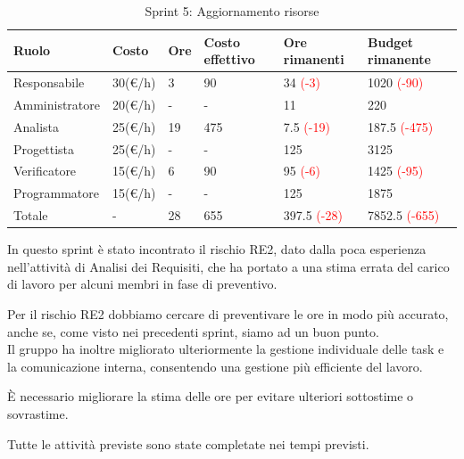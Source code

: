 \begin{table}[H]
	\centering
	\begin{tabular}{|p{}|p{}|p{}|p{}|p{}|p{}|}
		\hline
		\rowcolor{gray!25}
		Ruolo & Costo & Ore & Costo \newline effettivo & Ore \newline rimanenti & Budget \newline rimanente \\ \hline
		Responsabile   & 30(€/h) & 3 & 90 & 34 \textcolor{red}{(-3)} & 1020 \textcolor{red}{(-90)} \\ \hline
		Amministratore & 20(€/h) & - & - & 11 & 220 \\ \hline
		Analista       & 25(€/h) & 19 & 475 & 7.5 \textcolor{red}{(-19)} & 187.5 \textcolor{red}{(-475)} \\ \hline
		Progettista    & 25(€/h) & - & - & 125 & 3125 \\ \hline
		Verificatore   & 15(€/h) & 6 & 90 & 95 \textcolor{red}{(-6)} & 1425 \textcolor{red}{(-95)} \\ \hline
		Programmatore  & 15(€/h) & - & - & 125 & 1875 \\ \hline
		Totale         & - & 28 & 655 & 397.5 \textcolor{red}{(-28)} & 7852.5 \textcolor{red}{(-655)} \\ \hline
	\end{tabular}
	\caption{Sprint 5: Aggiornamento risorse}
\end{table}
In questo sprint è stato incontrato il rischio RE2, dato dalla poca esperienza nell'attività di Analisi dei Requisiti, che ha portato a una stima errata del carico di lavoro per alcuni membri in fase di preventivo.

Per il rischio RE2 dobbiamo cercare di preventivare le ore in modo più accurato, anche se, come visto nei precedenti sprint, siamo ad un buon punto.\\
Il gruppo ha inoltre migliorato ulteriormente la gestione individuale delle task e la comunicazione interna, consentendo una gestione più efficiente del lavoro.

È necessario migliorare la stima delle ore per evitare ulteriori sottostime o sovrastime.

Tutte le attività previste sono state completate nei tempi previsti.
